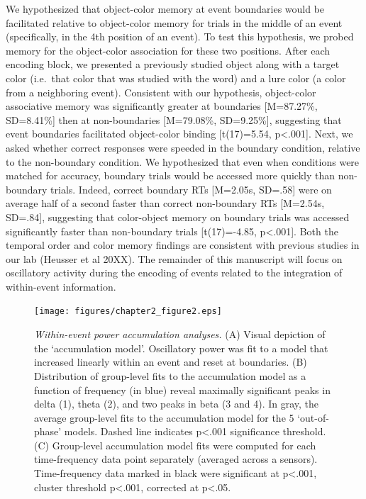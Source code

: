 We hypothesized that object-color memory at event boundaries would be
facilitated relative to object-color memory for trials in the middle of
an event (specifically, in the 4th position of an event). To test this
hypothesis, we probed memory for the object-color association for these
two positions. After each encoding block, we presented a previously
studied object along with a target color (i.e.~that color that was
studied with the word) and a lure color (a color from a neighboring
event). Consistent with our hypothesis, object-color associative memory
was significantly greater at boundaries {[}M=87.27\%, SD=8.41\%{]} then
at non-boundaries {[}M=79.08\%, SD=9.25\%{]}, suggesting that event
boundaries facilitated object-color binding {[}t(17)=5.54,
p\textless{}.001{]}. Next, we asked whether correct responses were
speeded in the boundary condition, relative to the non-boundary
condition. We hypothesized that even when conditions were matched for
accuracy, boundary trials would be accessed more quickly than
non-boundary trials. Indeed, correct boundary RTs {[}M=2.05s, SD=.58{]}
were on average half of a second faster than correct non-boundary RTs
{[}M=2.54s, SD=.84{]}, suggesting that color-object memory on boundary
trials was accessed significantly faster than non-boundary trials
{[}t(17)=-4.85, p\textless{}.001{]}. Both the temporal order and color
memory findings are consistent with previous studies in our lab (Heusser
et al 20XX). The remainder of this manuscript will focus on oscillatory
activity during the encoding of events related to the integration of
within-event information.

\begin{figure}
  \centering
  \texttt{[image: figures/chapter2\_figure2.eps]}
  \caption[Within-event power accumulation analyses]{\textit{Within-event power accumulation analyses.} (A) Visual depiction of the ‘accumulation model’.  Oscillatory power was fit to a model that increased linearly within an event and reset at boundaries. (B) Distribution of group-level fits to the accumulation model as a function of frequency (in blue) reveal maximally significant peaks in delta (1), theta (2), and two peaks in beta (3 and 4).  In gray, the average group-level fits to the accumulation model for the 5 ‘out-of-phase’ models.  Dashed line indicates p<.001 significance threshold.  (C) Group-level accumulation model fits were computed for each time-frequency data point separately (averaged across a sensors).  Time-frequency data marked in black were significant at p<.001, cluster threshold p<.001, corrected at p<.05.}
  \label{chapter2_figure2}
\end{figure}

